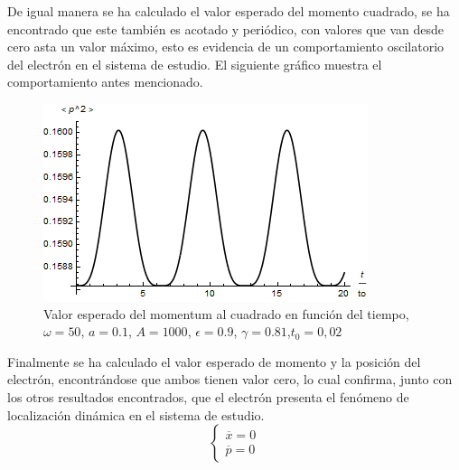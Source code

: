 De igual manera se ha calculado el valor esperado del momento cuadrado, se ha encontrado que este también es acotado y periódico, con valores que van desde cero asta un valor máximo, esto es evidencia de un comportamiento oscilatorio del electrón en el sistema de estudio. El siguiente gráfico muestra el comportamiento antes mencionado.

\begin{figure}[H]
    \centering
    \includegraphics[scale=.7]{imagenes/p2-prom.png}
    \caption{Valor esperado del momentum al cuadrado en función del tiempo, $\omega=50$, $a=0.1$, $A=1000$, $\epsilon=0.9$, $\gamma=0.81$,$t_0=0,02$}
    \label{fig:5.15}
\end{figure}

Finalmente se ha calculado el valor esperado de momento y la posición del electrón, encontrándose que ambos tienen valor cero, lo cual confirma, junto con los otros resultados encontrados, que el electrón presenta el fenómeno de localización dinámica en el sistema de estudio.
\begin{equation}
    \begin{cases}
    \overline{x}=0\\ 
    \overline{p}=0
    \end{cases}
\end{equation}
